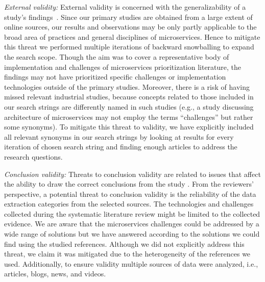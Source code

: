 \par \textit{External validity:}
External validity is concerned with the generalizability of a study’s
findings~\cite{Kitchenham2007}. Since our primary studies are obtained from a large extent of online sources, our results and observations may be only partly applicable to the broad area of practices and general disciplines of microservices. Hence to mitigate this threat we performed multiple iterations of backward snowballing to expand the search scope.
Though the aim was to
cover a representative body of implementation and challenges of microservices prioritization literature, the findings may not have prioritized specific challenges or implementation technologies outside of the primary studies. 
Moreover, there is a risk of having missed relevant industrial studies, because concepts related to those included in our search strings are differently named in such studies (e.g., a study discussing architecture of microservices may not employ the terms “challenges” but rather some synonyms). To mitigate this threat to validity, we have explicitly included all relevant synonyms in our search strings by looking at results for every iteration of chosen search string and finding enough articles to address the research questions. 


\par \textit{Conclusion validity:} 
Threats to conclusion validity are related to issues that affect the ability to draw the correct conclusions from the study \cite{Kitchenham2007}. From the reviewers’ perspective, a potential threat to conclusion validity is the reliability of the data extraction categories from the selected sources. The technologies and challenges collected during the systematic literature review might be limited to the collected evidence. We are aware that the microservices challenges could be addressed by a wide range of solutions but we have answered according to the solutions we could find using the studied references. Although we did not explicitly address this threat, we claim it was mitigated due to the heterogeneity of the references we used. Additionally, to ensure validity multiple sources of data were analyzed, i.e., articles, blogs, news, and videos. %

